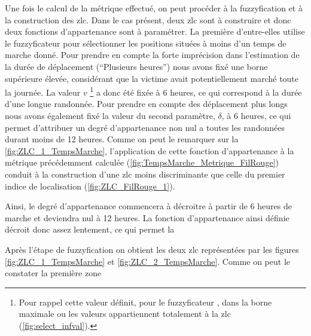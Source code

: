 Une fois le calcul de la métrique effectué, on peut procéder à la
fuzzyfication et à la construction des \ac{zlc}. Dans le cas présent,
deux \ac{zlc} sont à construire et donc deux fonctions d'appartenance
sont à paramétrer. La première d'entre-elles utilise le fuzzyficateur
 pour sélectionner les positions situées à moins
d'un temps de marche donné. Pour prendre en compte la forte
imprécision dans l'estimation de la durée de déplacement
(\enquote{Plusieurs heures}) nous avons fixé une borne supérieure
élevée, considérant que la victime avait potentiellement marché toute
la journée. La valeur \(v\) \footnote{Pour rappel cette valeur
  définit, pour le fuzzyficateur , dans la borne
  maximale ou les valeurs appartiennent totalement à la \ac{zlc}
  (\autoref{fig:select_infval}).} a donc été fixée à 6 heures, ce qui
correspond à la durée d'une longue randonnée. Pour prendre en compte
des déplacement plus longs nous avons également fixé la valeur du
second paramètre, \(\delta\), à 6 heures, ce qui permet d'attribuer un
degré d'appartenance non nul a toutes les randonnées durant moins de
12 heures. Comme on peut le remarquer sur la
\autoref{fig:ZLC_1_TempsMarche}, l’application de cette fonction
d'appartenance à la métrique précédemment calculée
(\autoref{fig:TempsMarche_Metrique_FilRouge}) conduit à la
construction d'une \ac{zlc} moins discriminante que celle du premier
indice de localisation (\autoref{fig:ZLC_FilRouge_1}).

Ainsi, le degré
d'appartenance commencera à décroitre à partir de 6 heures de marche
et deviendra nul à 12 heures. La fonction d'appartenance ainsi définie
décroit donc assez lentement, ce qui permet la

%
Après l'étape de fuzzyfication on obtient les deux \ac{zlc}
représentées par les figures \ref{fig:ZLC_1_TempsMarche} et
\ref{fig:ZLC_2_TempsMarche}.
%
Comme on peut le constater la première zone


